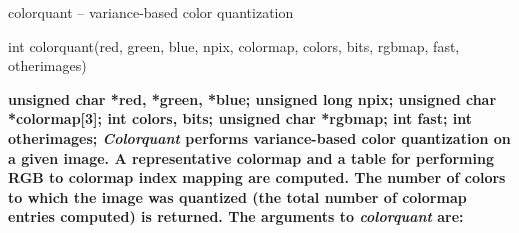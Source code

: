 colorquant -- variance-based color quantization
\begin{TPlist}{\bf}
\item[{\bf}]
int colorquant(red, green, blue, npix, colormap, colors, bits, rgbmap, fast, otherimages)
\end{TPlist}\par\noindent
\bf
unsigned char *red, *green, *blue;
\nwl
\bf
unsigned long npix;
\nwl
\bf
unsigned char *colormap[3];
\nwl
\bf
int colors, bits;
\nwl
\bf
unsigned char *rgbmap;
\nwl
\bf
int fast;
\nwl
\bf
int otherimages;
{\it Colorquant} 
performs variance-based color quantization on a given image.
A representative colormap
and a table for performing RGB to colormap index mapping are computed.  The
number of colors to which the image was quantized (the total number
of colormap entries computed) is returned.
The arguments to
{\it colorquant} 
are:
